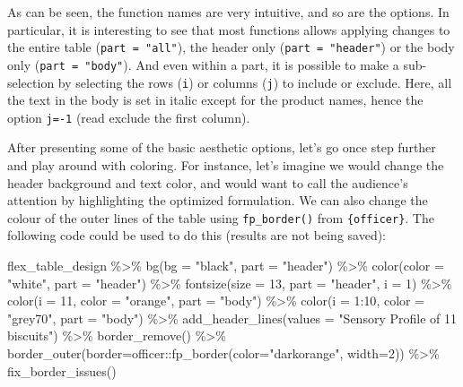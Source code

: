 \documentclass[
]{krantz}
\makeatletter
\newenvironment{Shaded}{\begin{snugshade}}{\end{snugshade}}
\newcommand{\AttributeTok}[1]{\textcolor[rgb]{0.61,0.61,0.61}{#1}}
\newcommand{\DecValTok}[1]{\textcolor[rgb]{0.06,0.06,0.06}{#1}}
\newcommand{\FunctionTok}[1]{\textcolor[rgb]{0,0,0}{#1}}
\newcommand{\NormalTok}[1]{#1}
\newcommand{\SpecialCharTok}[1]{\textcolor[rgb]{0,0,0}{#1}}
\newcommand{\StringTok}[1]{\textcolor[rgb]{0.5,0.5,0.5}{#1}}
\newenvironment{kframe}{%
\medskip{}
\setlength{\fboxsep}{.8em}
 \def\at@end@of@kframe{}%
 \ifinner\ifhmode%
  \def\at@end@of@kframe{\end{minipage}}%
  \begin{minipage}{\columnwidth}%
 \fi\fi%
 \def\FrameCommand##1{\hskip\@totalleftmargin \hskip-\fboxsep
 \colorbox{shadecolor}{##1}\hskip-\fboxsep
     \hskip-\linewidth \hskip-\@totalleftmargin \hskip\columnwidth}%
 \MakeFramed {\advance\hsize-\width
   \@totalleftmargin\z@ \linewidth\hsize
   \@setminipage}}%
 {\par\unskip\endMakeFramed%
 \at@end@of@kframe}
\renewenvironment{Shaded}{\begin{kframe}}{\end{kframe}}
\makeatother
\begin{document}
\renewcommand*{\arraystretch}{1}

As can be seen, the function names are very intuitive, and so are the options. In particular, it is interesting to see that most functions allows applying changes to the entire table (\texttt{part\ =\ "all"}), the header only (\texttt{part\ =\ "header"}) or the body only (\texttt{part\ =\ "body"}). And even within a part, it is possible to make a sub-selection by selecting the rows (\texttt{i}) or columns (\texttt{j}) to include or exclude. Here, all the text in the body is set in italic except for the product names, hence the option \texttt{j=-1} (read exclude the first column).

After presenting some of the basic aesthetic options, let's go once step further and play around with coloring. For instance, let's imagine we would change the header background and text color, and would want to call the audience's attention by highlighting the optimized formulation. We can also change the colour of the outer lines of the table using \texttt{fp\_border()} from \texttt{\{officer\}}. The following code could be used to do this (results are not being saved):

\begin{Shaded}
\begin{Highlighting}[]
\NormalTok{flex\_table\_design }\SpecialCharTok{\%\textgreater{}\%}
  \FunctionTok{bg}\NormalTok{(}\AttributeTok{bg =} \StringTok{"black"}\NormalTok{, }\AttributeTok{part =} \StringTok{"header"}\NormalTok{) }\SpecialCharTok{\%\textgreater{}\%} 
  \FunctionTok{color}\NormalTok{(}\AttributeTok{color =} \StringTok{"white"}\NormalTok{, }\AttributeTok{part =} \StringTok{"header"}\NormalTok{) }\SpecialCharTok{\%\textgreater{}\%} 
  \FunctionTok{fontsize}\NormalTok{(}\AttributeTok{size =} \DecValTok{13}\NormalTok{, }\AttributeTok{part =} \StringTok{"header"}\NormalTok{, }\AttributeTok{i =} \DecValTok{1}\NormalTok{) }\SpecialCharTok{\%\textgreater{}\%}
  \FunctionTok{color}\NormalTok{(}\AttributeTok{i =} \DecValTok{11}\NormalTok{, }\AttributeTok{color =} \StringTok{"orange"}\NormalTok{, }\AttributeTok{part =} \StringTok{"body"}\NormalTok{) }\SpecialCharTok{\%\textgreater{}\%}
  \FunctionTok{color}\NormalTok{(}\AttributeTok{i =} \DecValTok{1}\SpecialCharTok{:}\DecValTok{10}\NormalTok{, }\AttributeTok{color =} \StringTok{"grey70"}\NormalTok{, }\AttributeTok{part =} \StringTok{"body"}\NormalTok{) }\SpecialCharTok{\%\textgreater{}\%} 
  \FunctionTok{add\_header\_lines}\NormalTok{(}\AttributeTok{values =} \StringTok{"Sensory Profile of 11 biscuits"}\NormalTok{) }\SpecialCharTok{\%\textgreater{}\%} 
  \FunctionTok{border\_remove}\NormalTok{() }\SpecialCharTok{\%\textgreater{}\%} 
  \FunctionTok{border\_outer}\NormalTok{(}\AttributeTok{border=}\NormalTok{officer}\SpecialCharTok{::}\FunctionTok{fp\_border}\NormalTok{(}\AttributeTok{color=}\StringTok{"darkorange"}\NormalTok{, }\AttributeTok{width=}\DecValTok{2}\NormalTok{)) }\SpecialCharTok{\%\textgreater{}\%}
  \FunctionTok{fix\_border\_issues}\NormalTok{()}
\end{Highlighting}
\end{Shaded}
\end{document}
